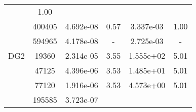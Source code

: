 \begin{table}
\begin{center}
{\begin{tabular}{| l | c | c | c | c | c |}
                &1.00\\
                
            &400405
            
                &4.692e-08
                
                &0.57
                
                &3.337e-03
                
                &1.00\\
                
            &594965
            
                &4.178e-08
                
                &-
                
                &2.725e-03
                
                &-\\
                \hline
        \hline
        \hspace{0.1cm}DG2\hspace{0.1cm}    
        
            &19360
            
                &2.314e-05
                
                &3.55
                
                &1.555e+02
                
                &5.01\\
                
            &47125
            
                &4.396e-06
                
                &3.53
                
                &1.485e+01
                
                &5.01\\
                
            &77120
            
                &1.916e-06
                
                &3.53
                
                &4.573e+00
                
                &5.01\\
                
            &195585
            
                &3.723e-07
                

\end{tabular}}
\end{center}
\end{table}
